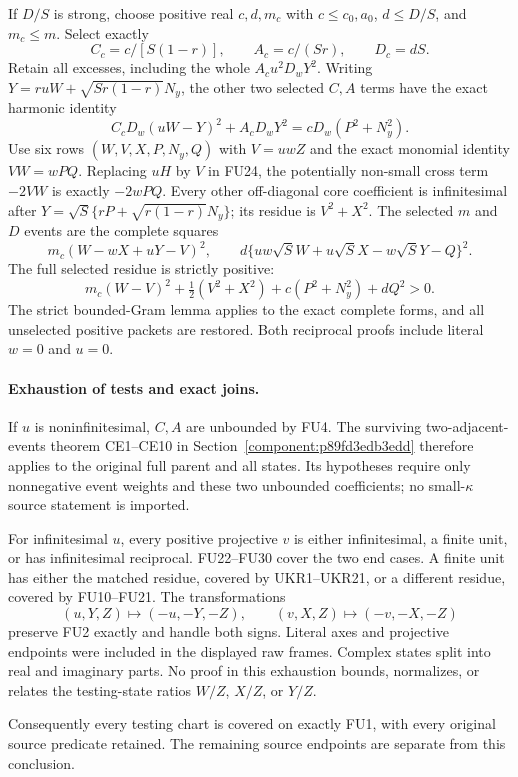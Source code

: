 If $D/S$ is strong, choose positive real $c,d,m_c$ with
$c\le c_0,a_0$, $d\le D/S$, and $m_c\le m$. Select exactly
\[
 C_c=c/[S(1-r)],\qquad A_c=c/(Sr),\qquad D_c=dS.
 \tag{FU27}
\]
Retain all excesses, including the whole $A_cu^2D_wY^2$.
Writing $Y=ruW+\sqrt{Sr(1-r)}N_y$, the other two selected
$C,A$ terms have the exact harmonic identity
\[
 C_cD_w(uW-Y)^2+A_cD_wY^2=cD_w(P^2+N_y^2).
 \tag{FU28}
\]
Use six rows $(W,V,X,P,N_y,Q)$ with $V=uwZ$ and the exact
monomial identity $VW=wPQ$. Replacing $uH$ by $V$ in FU24,
the potentially non-small cross term $-2VW$ is exactly $-2wPQ$.
Every other off-diagonal core coefficient is infinitesimal after
$Y=\sqrt S\{rP+\sqrt{r(1-r)}N_y\}$; its residue is $V^2+X^2$.
The selected $m$ and $D$ events are the complete squares
\[
 m_c(W-wX+uY-V)^2,\qquad
 d\{uw\sqrt S W+u\sqrt S X-w\sqrt S Y-Q\}^2.
 \tag{FU29}
\]
The full selected residue is strictly positive:
\[
 m_c(W-V)^2+\tfrac12(V^2+X^2)+c(P^2+N_y^2)+dQ^2>0.
 \tag{FU30}
\]
The strict bounded-Gram lemma applies to the exact complete
forms, and all unselected positive packets are restored. Both
reciprocal proofs include literal $w=0$ and $u=0$.

\paragraph{Exhaustion of tests and exact joins.}
If $u$ is noninfinitesimal, $C,A$ are unbounded by FU4. The
surviving two-adjacent-events theorem CE1--CE10 in
Section~\ref{component:p89fd3edb3edd}
therefore applies to the original full parent and all states.
Its hypotheses require only nonnegative event weights and these
two unbounded coefficients; no small-$\kappa$ source statement
is imported.

For infinitesimal $u$, every positive projective $v$ is either
infinitesimal, a finite unit, or has infinitesimal reciprocal.
FU22--FU30 cover the two end cases. A finite unit has either the
matched residue, covered by UKR1--UKR21, or a different residue,
covered by FU10--FU21. The transformations
\[
 (u,Y,Z)\mapsto(-u,-Y,-Z),\qquad
 (v,X,Z)\mapsto(-v,-X,-Z)
 \tag{FU31}
\]
preserve FU2 exactly and handle both signs. Literal axes and
projective endpoints were included in the displayed raw frames.
Complex states split into real and imaginary parts. No proof in
this exhaustion bounds, normalizes, or relates the testing-state
ratios $W/Z$, $X/Z$, or $Y/Z$.

Consequently every testing chart is covered on exactly FU1,
with every original source predicate retained. The remaining
source endpoints are separate from this conclusion.


